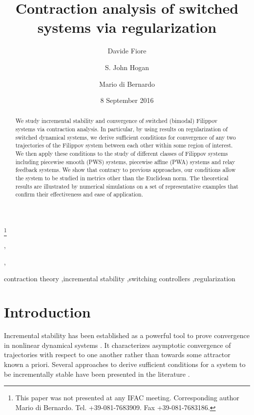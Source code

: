 \documentclass[twocolumn]{autart}
\date{8 September 2016}
\begin{document}
\begin{frontmatter}


\title{Contraction analysis of switched systems via regularization} 

\thanks[footnoteinfo]{This paper was not presented at any IFAC 
meeting. Corresponding author Mario di Bernardo. Tel. +39-081-7683909. Fax +39-081-7683186.}

\author[Napoli]{Davide Fiore},             
\author[Bristol]{S. John Hogan},  
\author[Napoli,Bristol]{Mario di Bernardo}    


\address[Napoli]{Department of Electrical Engineering and Information Technology, University of Naples Federico II, Via Claudio 21, 80125 Naples, Italy}  
\address[Bristol]{Department of Engineering Mathematics, University of Bristol, BS8 1TR Bristol, U.K.}


\begin{keyword}                         
contraction theory \sep incremental stability \sep switching controllers \sep regularization   
\end{keyword}            


\begin{abstract}                          We study incremental stability and convergence of switched (bimodal) Filippov systems via contraction analysis. In particular,  by using results on regularization of switched dynamical systems, we derive sufficient conditions for  convergence of any two trajectories of the Filippov system between each other within some region of interest. We then apply these conditions to the study of different classes of Filippov systems including piecewise smooth (PWS) systems, piecewise affine (PWA) systems and relay feedback systems. We show that contrary to previous approaches, our conditions allow the system to be studied in metrics other than the Euclidean norm. The theoretical results are illustrated by numerical simulations on a set of representative examples that confirm their effectiveness and ease of application.
\end{abstract}

\end{frontmatter}

\section{Introduction}
\label{sec:intro}
Incremental stability has been established as a powerful tool to prove convergence in nonlinear dynamical systems \citep{angeli2002lyapunov}. It characterizes asymptotic convergence of trajectories with respect to one another rather than towards some attractor known a priori. Several approaches to derive sufficient conditions for a system to be incrementally stable have been presented in the literature \citep{angeli2002lyapunov,russo2010global,lohmiller1998contraction,forni2014differential,pavlov2006uniform}.
\end{document}
